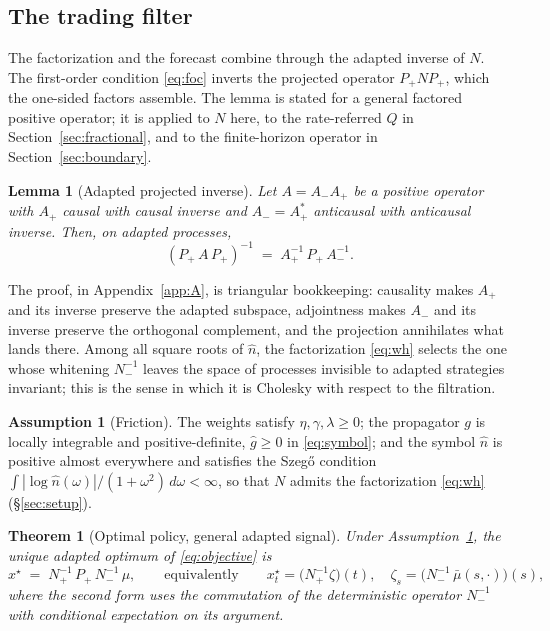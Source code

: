 \documentclass[11pt]{article}
\theoremstyle{plain}
\newtheorem{theorem}{Theorem}
\newtheorem{lemma}{Lemma}
\theoremstyle{definition}
\newtheorem{assumption}{Assumption}
\theoremstyle{remark}
\begin{document}
\subsection{The trading filter}\label{sec:filter}

The factorization and the forecast combine through the adapted inverse of $N$. The first-order condition \eqref{eq:foc} inverts the projected operator $P_+NP_+$, which the one-sided factors assemble. The lemma is stated for a general factored positive operator; it is applied to $N$ here, to the rate-referred $Q$ in Section~\ref{sec:fractional}, and to the finite-horizon operator in Section~\ref{sec:boundary}.

\begin{lemma}[Adapted projected inverse]\label{lem:pi}
Let $A=A_-A_+$ be a positive operator with $A_+$ causal with causal inverse and $A_-=A_+^*$ anticausal with anticausal inverse. Then, on adapted processes,
\begin{equation}\label{eq:pi}
(P_+\,A\,P_+)^{-1} \;=\; A_+^{-1}\,P_+\,A_-^{-1}.
\end{equation}
\end{lemma}

The proof, in Appendix~\ref{app:A}, is triangular bookkeeping: causality makes $A_+$ and its inverse preserve the adapted subspace, adjointness makes $A_-$ and its inverse preserve the orthogonal complement, and the projection annihilates what lands there. Among all square roots of $\hat n$, the factorization \eqref{eq:wh} selects the one whose whitening $N_-^{-1}$ leaves the space of processes invisible to adapted strategies invariant; this is the sense in which it is Cholesky with respect to the filtration.

\begin{assumption}[Friction]\label{ass:friction}
The weights satisfy $\eta,\gamma,\lambda\ge0$; the propagator $g$ is locally integrable and positive-definite, $\hat g\ge0$ in \eqref{eq:symbol}; and the symbol $\hat n$ is positive almost everywhere and satisfies the Szeg\H{o} condition $\int|\log\hat n(\omega)|/(1+\omega^2)\,d\omega<\infty$, so that $N$ admits the factorization \eqref{eq:wh} (\S\ref{sec:setup}).
\end{assumption}

\begin{theorem}[Optimal policy, general adapted signal]\label{thm:general}
Under Assumption~\ref{ass:friction}, the unique adapted optimum of \eqref{eq:objective} is
\begin{equation}\label{eq:policy}
x^\star \;=\; N_+^{-1}\,P_+\,N_-^{-1}\,\mu,
\qquad\text{equivalently}\qquad
x^\star_t = \bigl(N_+^{-1}\zeta\bigr)(t), \quad
\zeta_s = \bigl(N_-^{-1}\,\bar\mu(s,\cdot)\bigr)(s),
\end{equation}
where the second form uses the commutation of the deterministic operator $N_-^{-1}$ with conditional expectation on its argument.
\end{theorem}
\end{document}
